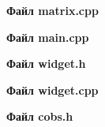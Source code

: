 \documentclass[14pt,a4paper]{extreport}
\begin{document}
\textbf{Файл matrix.cpp}
\begin{alltt}
    
\end{alltt}

\textbf{Файл main.cpp}
\begin{alltt}
    
\end{alltt}

\textbf{Файл widget.h}
\begin{alltt}
    
\end{alltt}

\textbf{Файл widget.cpp}
\begin{alltt}
    
\end{alltt}

\textbf{Файл cobs.h}
\begin{alltt}
    
\end{alltt}
\end{document}
